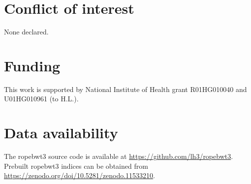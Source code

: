 \documentclass[webpdf,contemporary,large,namedate]{oup-authoring-template}%
\begin{document}
\section*{Conflict of interest}

None declared.

\section*{Funding}

This work is supported by National Institute of Health grant R01HG010040 and U01HG010961 (to H.L.).

\section*{Data availability}

The ropebwt3 source code is available at \url{https://github.com/lh3/ropebwt3}.
Prebuilt ropebwt3 indices can be obtained from \url{https://zenodo.org/doi/10.5281/zenodo.11533210}.


{\sffamily\small
}
\end{document}
